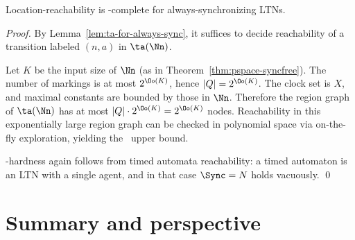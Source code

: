 \begin{theorem}
\label{thm:pspace-always}
Location-reachability is \PSPACE-complete for always-synchronizing LTNs.
\end{theorem}

\begin{proof}
By Lemma~\ref{lem:ta-for-always-sync}, it suffices to decide reachability of a
transition labeled $(n,a)$ in $\ta(\Nn)$.

Let $K$ be the input size of $\Nn$ (as in Theorem~\ref{thm:pspace-syncfree}).
The number of markings is at most $2^{\Oo(K)}$, hence $|Q|=2^{\Oo(K)}$.
The clock set is $X$, and maximal constants are bounded by those in $\Nn$.
Therefore the region graph of $\ta(\Nn)$ has at most
$|Q|\cdot 2^{\Oo(K)} = 2^{\Oo(K)}$ nodes. Reachability in this exponentially
large region graph can be checked in polynomial space via on-the-fly exploration,
yielding the \PSPACE\ upper bound.

\PSPACE-hardness again follows from timed automata reachability: a timed automaton
is an LTN with a single agent, and in that case $\Sync=N$ holds vacuously. \qed
\end{proof}




\section{Summary and perspective}
\label{sec:fragments-summary}

